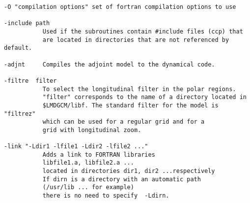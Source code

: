 {\begin{verbatim}
-O "compilation options" set of fortran compilation options to use

-include path
           Used if the subroutines contain #include files (ccp) that 
           are located in directories that are not referenced by default.

-adjnt     Compiles the adjoint model to the dynamical code.

-filtre  filter
           To select the longitudinal filter in the polar regions.
           "filter" corresponds to the name of a directory located in
           $LMDGCM/libf. The standard filter for the model is "filtrez"
           which can be used for a regular grid and for a  
           grid with longitudinal zoom.

-link "-Ldir1 -lfile1 -Ldir2 -lfile2 ..."
           Adds a link to FORTRAN libraries
           libfile1.a, libfile2.a ... 
           located in directories dir1, dir2 ...respectively
           If dirn is a directory with an automatic path 
           (/usr/lib ... for example) 
           there is no need to specify  -Ldirn.

\end{verbatim}
}
